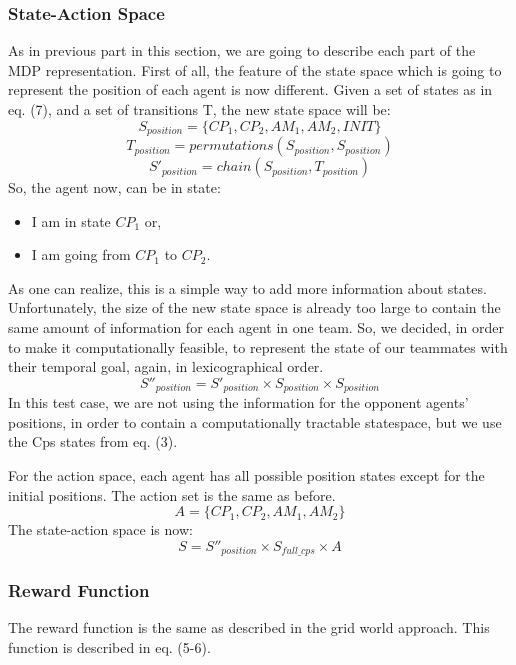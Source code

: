 \documentclass[conference]{IEEEtran}
\begin{document}
\subsubsection{State-Action Space}
As in previous part in this section, we are going to describe each part of the MDP representation. First of all, the feature of the state space which is going to represent the position of each agent is now different. Given a set of states as in eq. (7), and a set of transitions T, the new state space will be:
\begin{equation}
S_{position} = \lbrace CP_1, CP_2, AM_1, AM_2, INIT  \rbrace
\end{equation}
\begin{equation}
T_{position} = permutations(S_{position}, S_{position})
\end{equation}
\begin{equation}
S'_{position} = chain(S_{position}, T_{position})
\end{equation}
So, the agent now, can be in state:
\begin{itemize}
\item I am in state $CP_1$ or,
\item I am going from $CP_1$ to $CP_2$.
\end{itemize}
As one can realize, this is a simple way to add more information about states. Unfortunately, the size of the new state space is already too large to contain the same amount of information for each agent in one team. So, we decided, in order to make it computationally feasible, to represent the state of our teammates with their temporal goal, again, in lexicographical order.
\begin{equation}
S''_{position} = S'_{position} \times S_{position} \times S_{position} 
\end{equation}
In this test case, we are not using the information for the opponent agents' positions, in order to contain a computationally tractable statespace, but we use the Cps states from eq. (3).

For the action space, each agent has all possible position states except for the initial positions.
The action set is the same as before.
\begin{equation}
A = \lbrace CP_1, CP_2, AM_1, AM_2 \rbrace
\end{equation}
The state-action space is now:
\begin{equation}
S = S''_{position} \times S_{full\_cps} \times A
\end{equation}
\subsubsection{Reward Function}
The reward function is the same as described in the grid world approach. This function is described in eq. (5-6).
\end{document}

